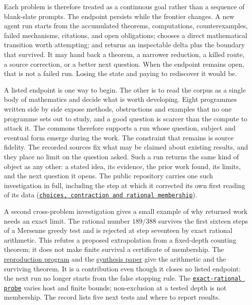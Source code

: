 \documentclass[10pt]{article}
\newcommand{\repobase}{https://github.com/wcook04/plectis-erdos}
\newcommand{\repolink}[2]{\href{\repobase/blob/402497d8e1ae025518ee34190664e8f67aa40f93/#1}{\texttt{#2}}}
\begin{document}
Each problem is therefore treated as a continuous goal rather than a sequence
of blank-slate prompts.  The endpoint persists while the frontier changes.  A
new agent run starts from the accumulated theorems, computations,
counterexamples, failed mechanisms, citations, and open obligations; chooses a
direct mathematical transition worth attempting; and returns an inspectable
delta plus the boundary that survived.  It may hand back a theorem, a narrower
reduction, a killed route, a source correction, or a better next question.
When the endpoint remains open, that is not a failed run.  Losing the state and
paying to rediscover it would be.

A listed endpoint is one way to begin.  The other is to read the corpus as a
single body of mathematics and decide what is worth developing.  Eight
programmes written side by side expose methods, obstructions and examples that
no one programme sets out to study, and a good question is scarcer than the
compute to attack it.  The commons therefore supports a run whose question,
subject and eventual form emerge during the work.  The constraint that remains
is source fidelity.  The recorded sources fix what may be claimed about
existing results, and they place no limit on the question asked.  Such a run
returns the same kind of object as any other: a stated idea, its evidence, the
prior work found, its limits, and the next question it opens.  The public
repository carries one such investigation in full, including the step at which
it corrected its own first reading of its data
(\repolink{research/experiments/choices_contraction/README.md}{choices,
contraction and rational membership}).

A second cross-problem investigation gives a small example of why returned
work needs an exact limit. The rational number $189/388$ survives the first
sixteen steps of a Mersenne greedy test and is rejected at step seventeen by
exact rational arithmetic. This refutes a proposed extrapolation from a
fixed-depth counting theorem; it does not make finite survival a certificate
of membership. The
\href{\repobase/blob/61e2e6a6b852d5250f0c722132531d7784664bbe/research/experiments/sparse_interpolation/late_rejection.py}{reproduction program}
and the
\href{\repobase/blob/61e2e6a6b852d5250f0c722132531d7784664bbe/paper/synthesis/optimal-sparse-perturbations.tex}{synthesis paper}
give the arithmetic and the surviving theorem. It is a contribution even
though it closes no listed endpoint: the next run no longer starts from the
false stopping rule. The
\repolink{research/experiments/choices_contraction/README.md}{exact-rational probe}
varies host and finite bounds; non-exclusion at a tested depth is not
membership. The record lists five next tests and where to report results.
\end{document}
